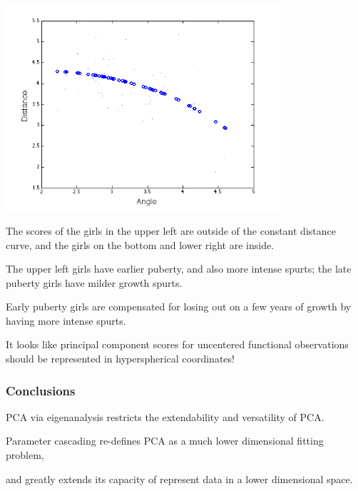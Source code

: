 \documentclass[11pt]{beamer}
\begin{document}

\begin{frame}

\begin{center}
\includegraphics[width=4in]{figs/GrowthFSmooth.png}
\end{center}

\end{frame}


\begin{frame}

\bi
  \item The scores of the girls in the upper left are outside of the constant distance curve, 
  and the girls on the bottom and lower right are inside.  
  \item The upper left girls have earlier puberty, and also more intense spurts;  the late puberty girls have milder growth spurts.  
  \item Early puberty girls are compensated for losing out on a few years of growth by having more intense spurts.
  \item It looks like principal component scores for uncentered functional observations should be represented in hyperspherical coordinates!
\ei

\end{frame}


\begin{frame}

\frametitle{Conclusions}

\bi
  \item PCA via eigenanalysis restricts the extendability and versatility of PCA.
  \item Parameter cascading re-defines PCA as a much lower dimensional fitting problem,
  \item and greatly extends its capacity of represent data in a lower dimensional space.
\ei

\end{frame}
\end{document}

